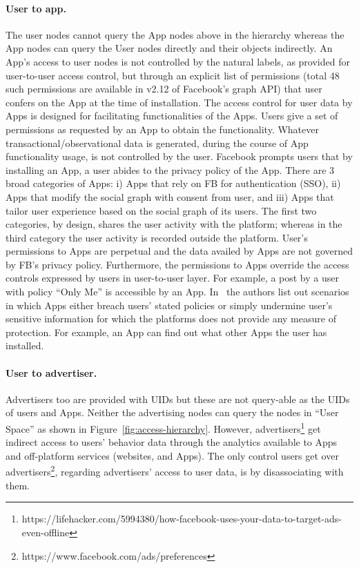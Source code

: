 \documentclass[a4paper,twoside]{article}
\begin{document}
\paragraph{User to app.} The user nodes cannot query the App nodes
above in the hierarchy whereas the App nodes can query the User nodes
directly and their objects indirectly. An App's access to user nodes
is not controlled by the natural labels, as provided for user-to-user
access control, but through an explicit list of permissions (total 48
such permissions are available in v2.12 of Facebook's graph API) that
user confers on the App at the time of installation. The access
control for user data by Apps is designed for facilitating
functionalities of the Apps. Users give a set of permissions as
requested by an App to obtain the functionality. Whatever
transactional/observational data is generated, during the course of
App functionality usage, is not controlled by the user. Facebook
prompts users that by installing an App, a user abides to the privacy
policy of the App. There are 3 broad categories of Apps: i) Apps that
rely on FB for authentication (SSO), ii) Apps that modify the social
graph with consent from user, and iii) Apps that tailor user
experience based on the social graph of its users. The first two
categories, by design, shares the user activity with the platform;
whereas in the third category the user activity is recorded outside
the platform. User's permissions to Apps are perpetual and the data
availed by Apps are not governed by FB's privacy policy. Furthermore,
the permissions to Apps override the access controls expressed by
users in user-to-user layer. For example, a post by a user with policy
``Only Me'' is accessible by an
App. In~\cite{isrdc-tr-2017-rks-vtp-privacy-fb-apps} the authors list
out scenarios in which Apps either breach users' stated policies or
simply undermine user's sensitive information for which the platforms
does not provide any measure of protection. For example, an App can
find out what other Apps the user has installed.
%
%
\paragraph{User to advertiser.} Advertisers too are provided with UIDs
but these are not query-able as the UIDs of users and Apps. Neither
the advertising nodes can query the nodes in ``User Space'' as shown
in Figure~\ref{fig:access-hierarchy}. However,
advertisers\footnote{https://lifehacker.com/5994380/how-facebook-uses-your-data-to-target-ads-even-offline}
get indirect access to users' behavior data through the analytics
available to Apps and off-platform services (websites, and Apps). The
only control users get over
advertisers\footnote{https://www.facebook.com/ads/preferences},
regarding advertisers' access to user data, is by disassociating with
them.
%
%
\end{document}
